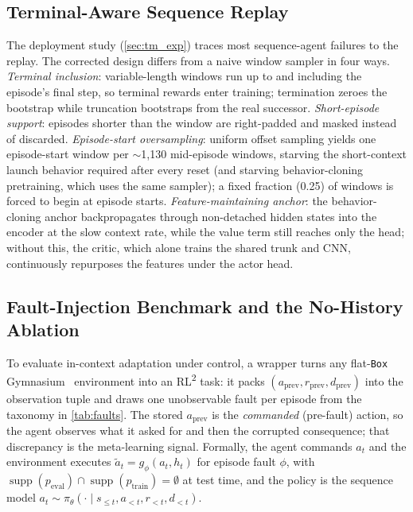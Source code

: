 \documentclass[conference]{IEEEtran}
\newcommand{\rltwo}{RL\textsuperscript{2}}
\begin{document}
\subsection{Terminal-Aware Sequence Replay}

\label{sec:seqreplay}

The deployment study (\cref{sec:tm_exp}) traces most sequence-agent failures to the replay. The corrected design differs from a naive window sampler in four ways. \emph{Terminal inclusion}: variable-length windows run up to and including the episode's final step, so terminal rewards enter training; termination zeroes the bootstrap while truncation bootstraps from the real successor. \emph{Short-episode support}: episodes shorter than the window are right-padded and masked instead of discarded. \emph{Episode-start oversampling}: uniform offset sampling yields one episode-start window per $\sim$1{,}130 mid-episode windows, starving the short-context launch behavior required after every reset (and starving behavior-cloning pretraining, which uses the same sampler); a fixed fraction (0.25) of windows is forced to begin at episode starts. \emph{Feature-maintaining anchor}: the behavior-cloning anchor backpropagates through non-detached hidden states into the encoder at the slow context rate, while the value term still reaches only the head; without this, the critic, which alone trains the shared trunk and CNN, continuously repurposes the features under the actor head.



\subsection{Fault-Injection Benchmark and the No-History Ablation}

\label{sec:benchmark}

To evaluate in-context adaptation under control, a wrapper turns any flat-\texttt{Box} Gymnasium~\cite{gymnasium} environment into an \rltwo{} task: it packs $(a_{\text{prev}}, r_{\text{prev}}, d_{\text{prev}})$ into the observation tuple and draws one unobservable fault per episode from the taxonomy in \cref{tab:faults}. The stored $a_{\text{prev}}$ is the \emph{commanded} (pre-fault) action, so the agent observes what it asked for and then the corrupted consequence; that discrepancy is the meta-learning signal. Formally, the agent commands $a_t$ and the environment executes $\tilde{a}_t = g_\phi(a_t, h_t)$ for episode fault $\phi$, with $\operatorname{supp}(p_{\text{eval}}) \cap \operatorname{supp}(p_{\text{train}}) = \emptyset$ at test time, and the policy is the sequence model $a_t \sim \pi_\theta(\cdot \mid s_{\leq t}, a_{<t}, r_{<t}, d_{<t})$.
\end{document}
